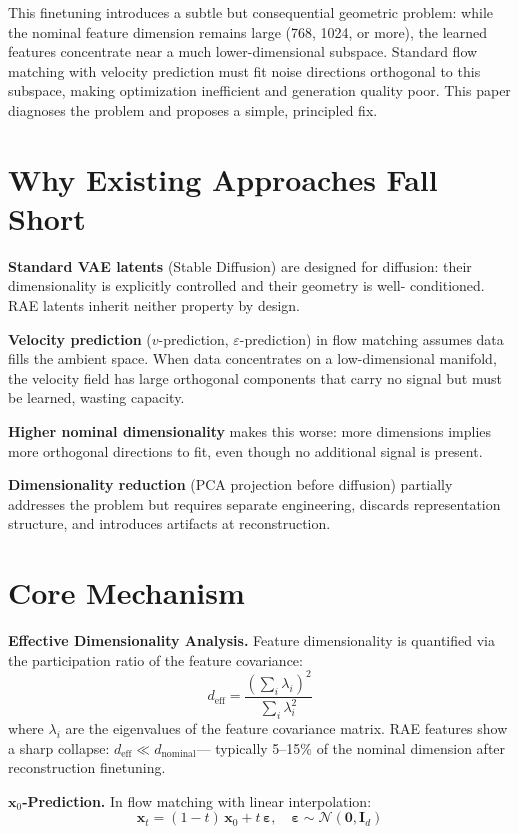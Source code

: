 \documentclass[10pt,twocolumn]{article}
\begin{document}
This finetuning introduces a subtle but consequential geometric problem:
while the nominal feature dimension remains large (768, 1024, or more),
the learned features concentrate near a much lower-dimensional subspace.
Standard flow matching with velocity prediction must fit noise directions
orthogonal to this subspace, making optimization inefficient and generation
quality poor. This paper diagnoses the problem and proposes a simple,
principled fix.

\section{Why Existing Approaches Fall Short}

\textbf{Standard VAE latents} (Stable Diffusion) are designed for diffusion:
their dimensionality is explicitly controlled and their geometry is well-
conditioned. RAE latents inherit neither property by design.

\textbf{Velocity prediction} ($v$-prediction, $\varepsilon$-prediction) in
flow matching assumes data fills the ambient space. When data concentrates
on a low-dimensional manifold, the velocity field has large orthogonal
components that carry no signal but must be learned, wasting capacity.

\textbf{Higher nominal dimensionality} makes this worse: more dimensions
implies more orthogonal directions to fit, even though no additional signal
is present.

\textbf{Dimensionality reduction} (PCA projection before diffusion) partially
addresses the problem but requires separate engineering, discards
representation structure, and introduces artifacts at reconstruction.

\section{Core Mechanism}

\textbf{Effective Dimensionality Analysis.} Feature dimensionality is
quantified via the participation ratio of the feature covariance:
\[
d_\text{eff} = \frac{\left(\sum_i \lambda_i\right)^2}{\sum_i \lambda_i^2}
\]
where $\lambda_i$ are the eigenvalues of the feature covariance matrix.
RAE features show a sharp collapse: $d_\text{eff} \ll d_\text{nominal}$---
typically 5--15\% of the nominal dimension after reconstruction finetuning.

\textbf{$\mathbf{x}_0$-Prediction.} In flow matching with linear interpolation:
\[
\mathbf{x}_t = (1-t)\,\mathbf{x}_0 + t\,\boldsymbol{\varepsilon},
\quad \boldsymbol{\varepsilon} \sim \mathcal{N}(\mathbf{0},\mathbf{I}_d)
\]
\end{document}
